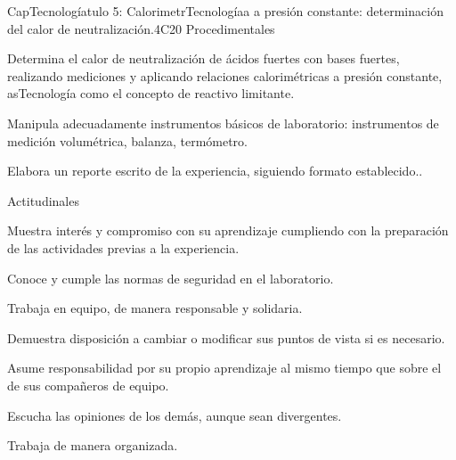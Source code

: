 \begin{syllabus}
\begin{unit}{CapTecnologíatulo 5:  CalorimetrTecnologíaa a presión constante: determinación del calor de neutralización.}{}{}{4}{C20}
   Procedimentales

\begin{topics}
      \item Determina el calor de neutralización de ácidos fuertes con bases fuertes, realizando mediciones y aplicando relaciones calorimétricas a presión constante, asTecnología como el concepto de reactivo limitante.
      \item Manipula adecuadamente instrumentos básicos de laboratorio: instrumentos de medición volumétrica, balanza, termómetro.
      \item Elabora un reporte escrito de la experiencia, siguiendo formato establecido..
   \end{topics}
   
   Actitudinales

\begin{topics}
      \item Muestra interés y compromiso con su aprendizaje cumpliendo con la preparación de las actividades previas a la experiencia.
	  \item Conoce y cumple las normas de seguridad en el laboratorio.
	  \item Trabaja en equipo, de manera responsable y solidaria.
	  \item Demuestra disposición a cambiar o modificar sus puntos de vista si es necesario.
	  \item Asume responsabilidad por su propio aprendizaje al mismo tiempo que sobre el de sus compañeros de equipo.
	  \item Escucha las opiniones de los demás, aunque sean divergentes.
	  \item Trabaja de manera organizada.
   \end{topics}

   \begin{learningoutcomes}
      \item 
   \end{learningoutcomes}
   
\end{unit}



\begin{coursebibliography}
\end{coursebibliography}


\end{syllabus}
